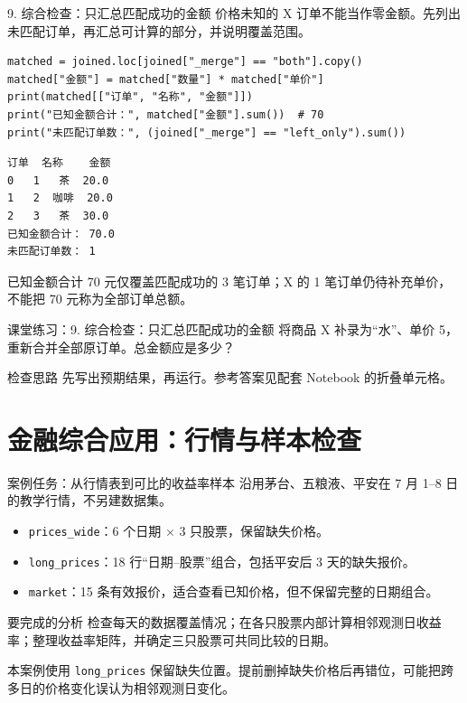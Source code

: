 \documentclass[9pt]{ctexbeamer}
\begin{document}
\begin{frame}[fragile]{9. 综合检查：只汇总匹配成功的金额}
\small 价格未知的 X 订单不能当作零金额。先列出未匹配订单，再汇总可计算的部分，并说明覆盖范围。
\medskip
\begin{lstlisting}[basicstyle=\ttfamily\scriptsize]
matched = joined.loc[joined["_merge"] == "both"].copy()
matched["金额"] = matched["数量"] * matched["单价"]
print(matched[["订单", "名称", "金额"]])
print("已知金额合计：", matched["金额"].sum())  # 70
print("未匹配订单数：", (joined["_merge"] == "left_only").sum())
\end{lstlisting}
\begin{lstlisting}[language={},numbers=none,basicstyle=\ttfamily\scriptsize]
   订单  名称    金额
0   1   茶  20.0
1   2  咖啡  20.0
2   3   茶  30.0
已知金额合计： 70.0
未匹配订单数： 1
\end{lstlisting}
\small 已知金额合计 70 元仅覆盖匹配成功的 3 笔订单；X 的 1 笔订单仍待补充单价，不能把 70 元称为全部订单总额。
\end{frame}
\begin{frame}[fragile]{课堂练习：9. 综合检查：只汇总匹配成功的金额}
将商品 X 补录为“水”、单价 5，重新合并全部原订单。总金额应是多少？
\medskip
\begin{block}{检查思路}
先写出预期结果，再运行。参考答案见配套 Notebook 的折叠单元格。
\end{block}
\end{frame}

\section{金融综合应用：行情与样本检查}

\begin{frame}{案例任务：从行情表到可比的收益率样本}
沿用茅台、五粮液、平安在 7 月 1--8 日的教学行情，不另建数据集。
\begin{itemize}
\item \texttt{prices\_wide}：6 个日期 $\times$ 3 只股票，保留缺失价格。
\item \texttt{long\_prices}：18 行“日期--股票”组合，包括平安后 3 天的缺失报价。
\item \texttt{market}：15 条有效报价，适合查看已知价格，但不保留完整的日期组合。
\end{itemize}
\begin{block}{要完成的分析}
检查每天的数据覆盖情况；在各只股票内部计算相邻观测日收益率；整理收益率矩阵，并确定三只股票可共同比较的日期。
\end{block}
\small 本案例使用 \texttt{long\_prices} 保留缺失位置。提前删掉缺失价格后再错位，可能把跨多日的价格变化误认为相邻观测日变化。
\end{frame}
\end{document}

